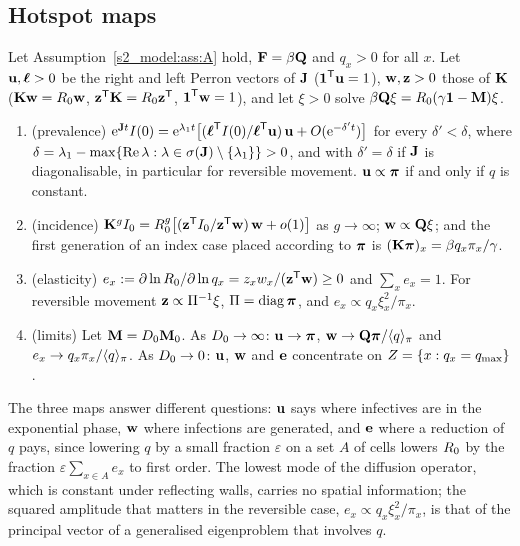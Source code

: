 \subsection{Hotspot maps}\label{s4_geometry:sec:hotspots}

\begin{theorem}\label{s4_geometry:thm:hotspots}
  Let Assumption~\ref{s2_model:ass:A} hold, $\mathbf{F}=\beta\mathbf{Q}$ and $q_x>0$ for all $x$. Let $\mathbf{u},\boldsymbol{\ell}>0$ be the
  right and left Perron vectors of $\mathbf{J}$ ($\boldsymbol{1}^{\mathsf{T}}\mathbf{u}=1$), $\mathbf{w},\mathbf{z}>0$ those of $\mathbf{K}$
  ($\mathbf{K}\mathbf{w}=R_0\mathbf{w}$, $\mathbf{z}^{\mathsf{T}}\mathbf{K}=R_0\mathbf{z}^{\mathsf{T}}$, $\boldsymbol{1}^{\mathsf{T}}\mathbf{w}=1$), and let $\xi>0$ solve
  $\beta\mathbf{Q}\xi=R_0(\gamma\mathbf{1}-\mathbf{M})\xi$.
  \begin{enumerate}
    \item[(i)] (prevalence) $\mathrm{e}^{\mathbf{J} t}I(0)=\mathrm{e}^{\lambda_1 t}\bigl[(\boldsymbol{\ell}^{\mathsf{T}}I(0)/\boldsymbol{\ell}^{\mathsf{T}}\mathbf{u})\,\mathbf{u}+O(\mathrm{e}^{-\delta' t})\bigr]$
       for every $\delta'<\delta$, where
       $\delta=\lambda_1-\max\{\operatorname{Re}\lambda:\lambda\in\sigma(\mathbf{J})\setminus\{\lambda_1\}\}>0$, and with
       $\delta'=\delta$ if $\mathbf{J}$ is diagonalisable, in particular for reversible movement. $\mathbf{u}\propto\boldsymbol{\pi}$
       if and only if $q$ is constant.
    \item[(ii)] (incidence) $\mathbf{K}^{g}I_0=R_0^{g}\bigl[(\mathbf{z}^{\mathsf{T}}I_0/\mathbf{z}^{\mathsf{T}}\mathbf{w})\,\mathbf{w}+o(1)\bigr]$ as
       $g\to\infty$; $\mathbf{w}\propto\mathbf{Q}\xi$; and the first generation of an index case placed according to
       $\boldsymbol{\pi}$ is $(\mathbf{K}\boldsymbol{\pi})_x=\beta q_x\pi_x/\gamma$.
    \item[(iii)] (elasticity) $e_x:=\partial\ln R_0/\partial\ln q_x=z_xw_x/(\mathbf{z}^{\mathsf{T}}\mathbf{w})\ge0$ and $\sum_xe_x=1$.
       For reversible movement $\mathbf{z}\propto\Pi^{-1}\xi$, $\Pi=\operatorname{diag}\boldsymbol{\pi}$, and $e_x\propto q_x\xi_x^2/\pi_x$.
    \item[(iv)] (limits) Let $\mathbf{M}=D_0\mathbf{M}_0$. As $D_0\to\infty$: $\mathbf{u}\to\boldsymbol{\pi}$, $\mathbf{w}\to\mathbf{Q}\boldsymbol{\pi}/\langle q\rangle_{\pi}$ and
       $e_x\to q_x\pi_x/\langle q\rangle_{\pi}$. As $D_0\to0$: $\mathbf{u}$, $\mathbf{w}$ and $\mathbf{e}$ concentrate on $Z=\{x:q_x=q_{\max}\}$.
  \end{enumerate}
\end{theorem}

The three maps answer different questions: $\mathbf{u}$ says where infectives are in the exponential phase, $\mathbf{w}$
where infections are generated, and $\mathbf{e}$ where a reduction of $q$ pays, since lowering $q$ by a small
fraction $\varepsilon$ on a set $A$ of cells lowers $R_0$ by the fraction $\varepsilon\sum_{x\in A}e_x$ to first
order. The lowest mode of the diffusion operator, which is constant under reflecting walls, carries no spatial
information; the squared amplitude that matters in the reversible case, $e_x\propto q_x\xi_x^2/\pi_x$, is that
of the principal vector of a generalised eigenproblem that involves $q$.

